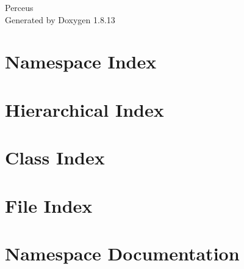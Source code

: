 \documentclass[twoside]{book}
\newcommand{\+}{\discretionary{\mbox{\scriptsize$\hookleftarrow$}}{}{}}
\newcommand{\clearemptydoublepage}{%
  \newpage{\pagestyle{empty}\cleardoublepage}%
}
\begin{document}
\hypersetup{pageanchor=false,
             bookmarksnumbered=true,
             pdfencoding=unicode
            }
\begin{titlepage}
\vspace*{7cm}
\begin{center}%
{\Large Perceus }\\
\vspace*{1cm}
{\large Generated by Doxygen 1.8.13}\\
\end{center}
\end{titlepage}
\clearemptydoublepage
{}
\tableofcontents
\clearemptydoublepage
{}
\hypersetup{pageanchor=true}

\chapter{Namespace Index}

\chapter{Hierarchical Index}

\chapter{Class Index}

\chapter{File Index}

\chapter{Namespace Documentation}





\end{document}

